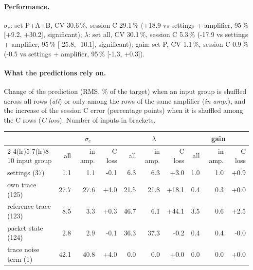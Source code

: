 \paragraph{Performance.}
$\sigma_e$: set P+A+B, CV 30.6\,\%, session C 29.1\,\% (+18.9 vs settings + amplifier, 95\,\% [+9.2, +30.2], significant); $\lambda$: set all, CV 30.1\,\%, session C 5.3\,\% (-17.9 vs settings + amplifier, 95\,\% [-25.8, -10.1], significant); gain: set P, CV 1.1\,\%, session C 0.9\,\% (-0.5 vs settings + amplifier, 95\,\% [-1.3, +0.3]).
\paragraph{What the predictions rely on.} Change of the prediction (RMS, \% of the target) when an input group is shuffled across all rows (\emph{all}) or only among the rows of the same amplifier (\emph{in amp.}), and the increase of the session C error (percentage points) when it is shuffled among the C rows (\emph{C loss}). Number of inputs in brackets.
\begin{center}\footnotesize
\begin{tabular}{lrrrrrrrrr}
\toprule
 & \multicolumn{3}{c}{$\sigma_e$} & \multicolumn{3}{c}{$\lambda$} & \multicolumn{3}{c}{gain} \\
\cmidrule(lr){2-4}\cmidrule(lr){5-7}\cmidrule(lr){8-10}
input group & all & in amp. & C loss & all & in amp. & C loss & all & in amp. & C loss \\
\midrule
settings (37) & 1.1 & 1.1 & -0.1 & 6.3 & 6.3 & +3.0 & 1.0 & 1.0 & +0.9 \\
own trace (125) & 27.7 & 27.6 & +4.0 & 21.5 & 21.8 & +18.1 & 0.4 & 0.3 & +0.0 \\
reference trace (123) & 8.5 & 3.3 & +0.3 & 46.7 & 6.1 & +44.1 & 3.5 & 0.6 & +2.5 \\
packet state (124) & 2.8 & 2.9 & -0.1 & 36.3 & 37.3 & -0.2 & 0.4 & 0.4 & -0.0 \\
trace noise term (1) & 42.1 & 40.8 & +4.0 & 0.0 & 0.0 & +0.0 & 0.0 & 0.0 & +0.0 \\
\bottomrule
\end{tabular}
\end{center}
